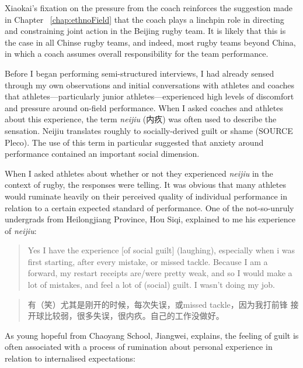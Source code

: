 \begin{CJK}{UTF8}{gbsn}
Xiaokai's fixation on the pressure from the coach reinforces the suggestion made in Chapter ~\ref{chap:ethnoField} that the coach plays a linchpin role in directing and constraining joint action in the Beijing rugby team.  It is likely that this is the case in all Chinse rugby teams, and indeed, most rugby teams beyond China, in which a coach assumes overall responsibility for the team performance.



Before I began performing semi-structured interviews, I had already sensed through my own observations and initial conversations with athletes and coaches that athletes---particularly junior athletes---experienced high levels of discomfort and pressure around on-field performance. When I asked coaches and athletes about this experience, the term \textit{neijiu} (内疚) was often used to describe the sensation.  Neijiu translates roughly to socially-derived guilt or shame (SOURCE Pleco).  The use of this term in particular suggested that anxiety around performance contained an important social dimension.

When I asked athletes about whether or not they experienced \textit{neijiu} in the context of rugby, the responses were telling.  It was obvious that many athletes would ruminate heavily on their perceived quality of individual performance in relation to a certain expected standard of performance.  One of the not-so-unruly undergrads from Heilongjiang Province, Hou Siqi, explained to me his experience of \textit{neijiu}:

      \begin{quote}
        Yes I have the experience [of social guilt] (laughing), especially when i was first starting, after every mistake, or missed tackle.  Because I am a forward, my restart receipts are/were pretty weak, and so I would make a lot of mistakes, and feel a lot of (social) guilt.  I wasn't doing my job.
      \end{quote}

      \begin{quote}
        有（笑）尤其是刚开的时候，每次失误，或missed tackle，因为我打前锋 接开球比较弱，很多失误，很内疚。自己的工作没做好。 
      \end{quote}

As young hopeful from Chaoyang School, Jiangwei, explains, the feeling of guilt is often associated with a process of rumination about personal experience in relation to internalised expectations:


\end{CJK}

